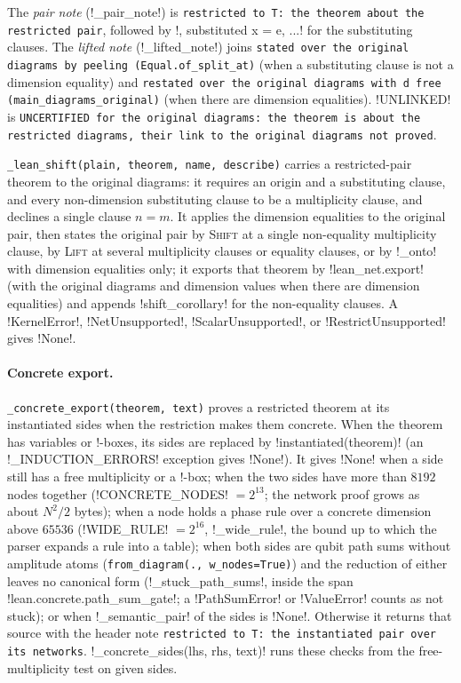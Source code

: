 The \emph{pair note} (\py!_pair_note!) is \texttt{restricted to T: the theorem about the restricted pair}, followed by \code!, substituted x = e, ...! for the substituting clauses. The \emph{lifted note} (\py!_lifted_note!) joins \texttt{stated over the original diagrams by peeling (\allowbreak{}Equal.\allowbreak{}of\_\allowbreak{}split\_\allowbreak{}at)} (when a substituting clause is not a dimension equality) and \texttt{restated over the original diagrams with d free (\allowbreak{}main\_\allowbreak{}diagrams\_\allowbreak{}original)} (when there are dimension equalities). \py!UNLINKED! is \texttt{UNCERTIFIED for the original diagrams: the theorem is about the restricted diagrams,\allowbreak{} their link to the original diagrams not proved}.

\texttt{\_\allowbreak{}lean\_\allowbreak{}shift(\allowbreak{}plain,\allowbreak{} theorem,\allowbreak{} name,\allowbreak{} describe)} carries a restricted-pair theorem to the original diagrams: it requires an origin and a substituting clause, and every non-dimension substituting clause to be a multiplicity clause, and declines a single clause $n=m$. It applies the dimension equalities to the original pair, then states the original pair by \textsc{Shift} at a single non-equality multiplicity clause, by \textsc{Lift} at several multiplicity clauses or equality clauses, or by \py!_onto! with dimension equalities only; it exports that theorem by \py!lean_net.export! (with the original diagrams and dimension values when there are dimension equalities) and appends \py!shift_corollary! for the non-equality clauses. A \py!KernelError!, \py!NetUnsupported!, \py!ScalarUnsupported!, or \py!RestrictUnsupported! gives \py!None!.

\paragraph{Concrete export.} \texttt{\_\allowbreak{}concrete\_\allowbreak{}export(\allowbreak{}theorem,\allowbreak{} text)} proves a restricted theorem at its instantiated sides when the restriction makes them concrete. When the theorem has variables or !-boxes, its sides are replaced by \py!instantiated(theorem)! (an \py!_INDUCTION_ERRORS! exception gives \py!None!). It gives \py!None! when a side still has a free multiplicity or a !-box; when the two sides have more than $8192$ nodes together (\py!CONCRETE_NODES! $=2^{13}$; the network proof grows as about $N^2/2$ bytes); when a node holds a phase rule over a concrete dimension above $65536$ (\py!WIDE_RULE! $=2^{16}$, \py!_wide_rule!, the bound up to which the parser expands a rule into a table); when both sides are qubit path sums without amplitude atoms (\texttt{from\_\allowbreak{}diagram(\allowbreak{}.\allowbreak{},\allowbreak{} w\_\allowbreak{}nodes=True)}) and the reduction of either leaves no canonical form (\py!_stuck_path_sums!, inside the span \code!lean.concrete.path_sum_gate!; a \py!PathSumError! or \py!ValueError! counts as not stuck); or when \py!_semantic_pair! of the sides is \py!None!. Otherwise it returns that source with the header note \texttt{restricted to T: the instantiated pair over its networks}. \py!_concrete_sides(lhs, rhs, text)! runs these checks from the free-multiplicity test on given sides.

